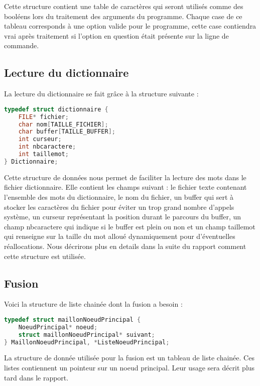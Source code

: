 \documentclass[15pt, a4paper]{article}
\begin{document}
Cette structure contient une table de caractères qui seront utilisés comme des booléens
lors du traitement des arguments du programme. Chaque case de ce tableau corresponds à
une option valide pour le programme, cette case contiendra vrai après traitement si 
l'option en question était présente sur la ligne de commande.

\subsection{Lecture du dictionnaire}

\noindent La lecture du dictionnaire se fait grâce à la structure suivante :

\begin{lstlisting}[language=c]
typedef struct dictionnaire {
    FILE* fichier;
    char nom[TAILLE_FICHIER];
    char buffer[TAILLE_BUFFER];
    int curseur;
    int nbcaractere;
    int taillemot;
} Dictionnaire;
\end{lstlisting}

Cette structure de données nous permet de faciliter la lecture des mots dans le fichier
dictionnaire. Elle contient les champs suivant : le fichier texte contenant l'ensemble des mots du 
dictionnaire, le nom du fichier, un buffer qui sert à stocker les caractères du fichier pour
éviter un trop grand nombre d'appels système, un curseur représentant
la position durant le parcours du buffer, un champ nbcaractere qui indique si
le buffer est plein ou non et un champ taillemot qui renseigne sur la
taille du mot alloué dynamiquement pour d'éventuelles réallocations. Nous
décrirons plus en details dans la suite du rapport comment cette
structure est utilisée. 

\subsection{Fusion}

\noindent Voici la structure de liste chainée dont la fusion a besoin :

\begin{lstlisting}[language=c]
typedef struct maillonNoeudPrincipal {
    NoeudPrincipal* noeud;
    struct maillonNoeudPrincipal* suivant;
} MaillonNoeudPrincipal, *ListeNoeudPrincipal;
\end{lstlisting}

La structure de donnée utilisée pour la fusion est un tableau de liste chainée. Ces 
listes contiennent un pointeur sur un noeud principal. Leur usage sera décrit plus tard
dans le rapport.
\end{document}
